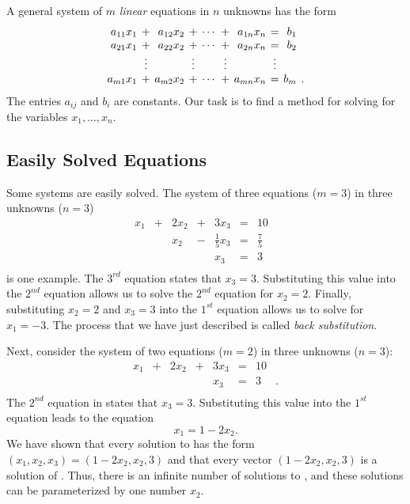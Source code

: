 A general system of $m$ {\em linear\/} equations 
in $n$ unknowns has the form
\begin{equation}    \label{general}
\arraycolsep 2pt
\begin{array}{rcrcrcrcrl}
 a_{11}x_1 & + & a_{12}x_2 & + & \cdots & + & a_{1n}x_n & = &   b_1
& \\
 a_{21}x_1 & + & a_{22}x_2 & + & \cdots & + & a_{2n}x_n & = &   b_2
& \\
        & \vdots &      & \vdots &    & \vdots &     & \vdots &
  & \\
 a_{m1}x_1 & + & a_{m2}x_2 & + & \cdots & + & a_{mn}x_n & = &   b_m
& .
\end{array}
\end{equation}
The entries $a_{ij}$ and $b_i$ are constants.  Our task is to find
a method for solving  for the variables
$x_1,\ldots,x_n$.

\subsection*{Easily Solved Equations}

Some systems are easily solved.  The system of three
equations ($m=3$) in three unknowns ($n=3$)
\begin{equation}
\begin{array}{rcrcrcrl} \label{examp3}
  x_1 & + & 2x_2 & + & 3x_3 & = &  10  & \\
      &   &  x_2 & - & \frac{1}{5}x_3 & = & \frac{7}{5}  & \\
      &   &      &   &  x_3 & = &   3  & \\
\end{array}
\end{equation}
is one example.  The $3^{rd}$ equation states that $x_3=3$.
Substituting this value into the $2^{nd}$ equation allows us to
solve the $2^{nd}$ equation for $x_2=2$.  Finally, substituting
$x_2=2$ and $x_3=3$ into the $1^{st}$ equation allows us to
solve for $x_1=-3$.  The process that we have just described is
called {\em back substitution\/}.

Next, consider the system of two equations ($m=2$) in three
unknowns ($n=3$):
\begin{equation}  \label{e23}
\begin{array}{rcrcrcrl}
  x_1 & + & 2x_2 & + & 3x_3 & = &  10  & \\
      &   &      &   &  x_3 & = &   3  & \! . \\
\end{array}
\end{equation}
The $2^{nd}$ equation in  states that $x_3=3$.
Substituting
this value into the $1^{st}$ equation leads to the equation
\[
x_1 = 1-2x_2.
\]
We have shown that every solution to  has the form
$(x_1,x_2,x_3)=(1-2x_2,x_2,3)$ and that every vector
$(1-2x_2,x_2,3)$ is a solution of .  Thus, there is an
infinite number of solutions to , and these solutions
can be parameterized by one number $x_2$.

